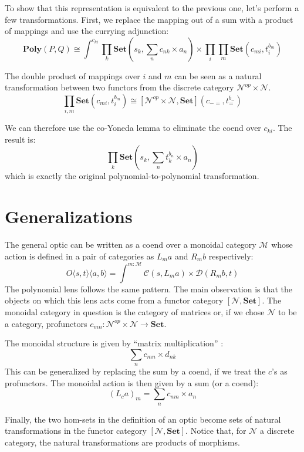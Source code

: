 \documentclass[11pt]{amsart}
\begin{document}
 
To show that this representation is equivalent to the previous one, let's perform a few transformations. First, we replace the mapping out of a sum with a product of mappings and use the currying adjunction:
\[ \mathbf{Poly}(P, Q) \cong \int^{c_{k i}} \prod_k  \mathbf{Set} \left(s_k, \sum_n c_{n k} \times a_n\right) \times  \prod_i  \prod_m \mathbf{Set} \left( c_{m i}, t_i^{b_m} \right) \]

 The double product of mappings over $i$ and $m$ can be seen as a natural transformation between two functors from the discrete category $\mathcal{N}^{op} \times \mathcal{N}$. 
  \[ \prod_{i, m}  \mathbf{Set} \left( c_{m i}, t_i^{b_m} \right) \cong [\mathcal{N}^{op} \times \mathcal{N}, \mathbf{Set}](c_{-=}, t_=^{b_{-}} )\]

 
 We can therefore use the co-Yoneda lemma to eliminate the coend over $c_{ki}$. The result is:
 \[ \prod_k \mathbf{Set}\left(s_k, \sum_n t_k^{b_n} \times a_n \right) \]
which is exactly the original polynomial-to-polynomial transformation.

\section{Generalizations}

The general optic can be written as a coend over a monoidal category $\mathcal{M}$ whose action is defined in a pair of categories as $L_m a$ and $R_m b$ respectively:
\[ O \langle s, t \rangle \langle a, b \rangle = \int^{m \colon \mathcal{M} } \mathcal{C} (s, L_m a) \times  \mathcal{D} (R_m b, t) \]
The polynomial lens follows the same pattern. The main observation is that the objects on which this lens acts come from a functor category $[\mathcal{N}, \mathbf{Set}]$. The monoidal category in question is the category of matrices or, if we chose $\mathcal{N}$ to be a category, profunctors $c_{m n} \colon \mathcal{N}^{op} \times \mathcal{N} \to \mathbf{Set}$.

The monoidal structure is given by ``matrix multiplication'' :
\[ \sum_n c_{m n} \times d_{n k} \]
This can be generalized by replacing the sum by a coend, if we treat the $c$'s as profunctors. The monoidal action is then given by a sum (or a coend):
\[ (L_{c} a)_m = \sum_n c_{ n m} \times a_n \]

Finally, the two hom-sets in the definition of an optic become sets of natural transformations in the functor category $ [\mathcal{N}, \mathbf{Set}] $. Notice that, for $\mathcal{N}$ a discrete category, the natural transformations are products of morphisms.
\end{document}
